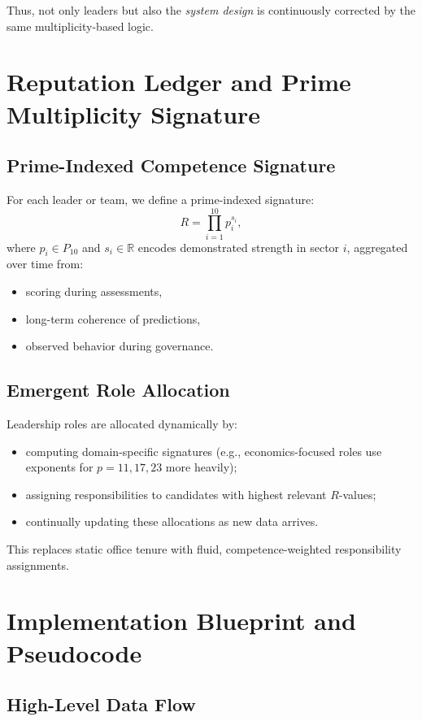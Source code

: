 \documentclass[11pt]{article}
\begin{document}
Thus, not only leaders but also the \emph{system design} is continuously corrected by the same multiplicity-based logic.

\section{Reputation Ledger and Prime Multiplicity Signature}

\subsection{Prime-Indexed Competence Signature}

For each leader or team, we define a prime-indexed signature:
\[
  R = \prod_{i=1}^{10} p_i^{s_i},
\]
where \(p_i \in P_{10}\) and \(s_i \in \mathbb{R}\) encodes demonstrated strength in sector \(i\), aggregated over time from:
\begin{itemize}[leftmargin=1.5em]
    \item scoring during assessments,
    \item long-term coherence of predictions,
    \item observed behavior during governance.
\end{itemize}

\subsection{Emergent Role Allocation}

Leadership roles are allocated dynamically by:
\begin{itemize}[leftmargin=1.5em]
    \item computing domain-specific signatures (e.g., economics-focused roles use exponents for \(p=11,17,23\) more heavily);
    \item assigning responsibilities to candidates with highest relevant \(R\)-values;
    \item continually updating these allocations as new data arrives.
\end{itemize}

This replaces static office tenure with fluid, competence-weighted responsibility assignments.

\section{Implementation Blueprint and Pseudocode}

\subsection{High-Level Data Flow}
\end{document}
